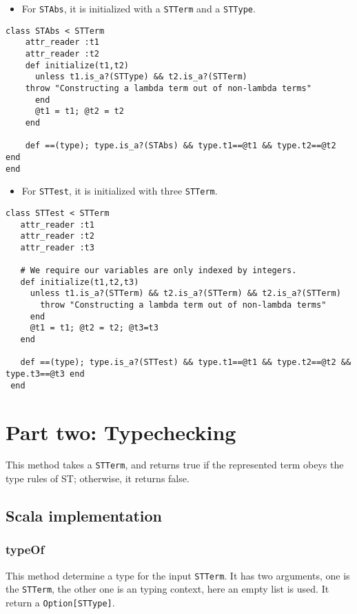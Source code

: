 \documentclass[11pt]{article}
\begin{document}
\begin{itemize}
\item For \texttt{STAbs}, it is initialized with a \texttt{STTerm} and a \texttt{STType}.
\end{itemize}
\begin{verbatim}
class STAbs < STTerm
    attr_reader :t1
    attr_reader :t2
    def initialize(t1,t2)
      unless t1.is_a?(STType) && t2.is_a?(STTerm)
	throw "Constructing a lambda term out of non-lambda terms"
      end
      @t1 = t1; @t2 = t2
    end

    def ==(type); type.is_a?(STAbs) && type.t1==@t1 && type.t2==@t2 end
end
\end{verbatim}

\begin{itemize}
\item For \texttt{STTest}, it is initialized with three \texttt{STTerm}.
\end{itemize}
\begin{verbatim}
class STTest < STTerm
   attr_reader :t1
   attr_reader :t2
   attr_reader :t3

   # We require our variables are only indexed by integers.
   def initialize(t1,t2,t3)
     unless t1.is_a?(STTerm) && t2.is_a?(STTerm) && t2.is_a?(STTerm)
       throw "Constructing a lambda term out of non-lambda terms"
     end
     @t1 = t1; @t2 = t2; @t3=t3
   end

   def ==(type); type.is_a?(STTest) && type.t1==@t1 && type.t2==@t2 && type.t3==@t3 end
 end
\end{verbatim}


\section{Part two: Typechecking}
\label{sec:org75fe152}
This method takes a \texttt{STTerm}, and returns true if the represented term obeys the type rules of ST; 
otherwise, it returns false.

\subsection{Scala implementation}
\label{sec:org94eedd4}
\subsubsection{typeOf}
\label{sec:org80efad3}
This method determine a type for the input \texttt{STTerm}. 
It has two arguments, one is the \texttt{STTerm}, the other one is an typing context, here an empty list is used.
It return a \texttt{Option[STType]}.
\end{document}
